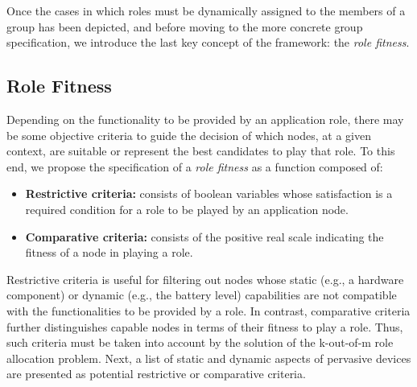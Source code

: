 Once the cases in which roles must be dynamically assigned to the members of a group has been depicted, and before moving to the more concrete group specification, we introduce the last key concept of the framework: the \textit{role fitness}. 

\subsection{Role Fitness}


Depending on the functionality to be provided by an application role, there may be some objective criteria to guide the decision of which nodes, at a given context, are suitable or represent the best candidates to play that role. To this end, we propose the specification of a \textit{role fitness} as a function composed of:

\begin{itemize}
	
	\item \textbf{Restrictive criteria:} consists of boolean variables whose satisfaction is a required condition for a role to be played by an application node.
	
	\item \textbf{Comparative criteria:} consists of the positive real scale indicating the fitness of a node in playing a role.
	
\end{itemize}


Restrictive criteria is useful for filtering out nodes whose static (e.g., a hardware component) or dynamic (e.g., the battery level) capabilities are not compatible with the functionalities to be provided by a role. In contrast, comparative criteria further distinguishes capable nodes in terms of their fitness to play a role. Thus, such criteria must be taken into account by the solution of the k-out-of-m role allocation problem. Next, a list of static and dynamic aspects of pervasive devices are presented as potential restrictive or comparative criteria.

